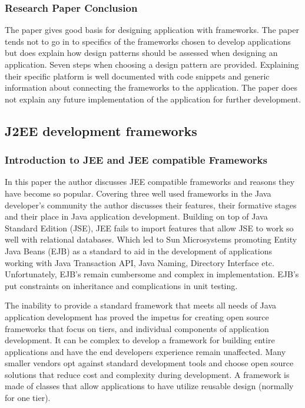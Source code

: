 										\subsubsection{Research Paper Conclusion}
										The paper gives good basis for designing application with frameworks. The paper tends not to go in to specifics of the frameworks chosen to develop applications but does explain how design patterns should be assessed when designing an application. Seven steps when choosing a design pattern are provided. Explaining their specific platform is well documented with code snippets and generic information about connecting the frameworks to the application. The paper does not explain any future implementation of the application for further development.
										
										\subsection{J2EE development frameworks}
										
										\subsubsection{Introduction to JEE and JEE compatible Frameworks}
										In this paper the author discusses JEE compatible frameworks and reasons they have become so popular. Covering three well used frameworks in the Java developer’s community the author discusses their features, their formative stages and their place in Java application development. Building on top of Java Standard Edition (JSE), JEE fails to import features that allow JSE to work so well with relational databases. Which led to Sun Microsystems promoting Entity Java Beans (EJB) as a standard to aid in the development of applications working with Java Transaction API, Java Naming, Directory Interface etc. Unfortunately, EJB’s remain cumbersome and complex in implementation. EJB’s put constraints on inheritance and complications in unit testing. 
										
										The inability to provide a standard framework that meets all needs of Java application development has proved the impetus for creating open source frameworks that focus on tiers, and individual components of application development. It can be complex to develop a framework for building entire applications and have the end developers experience remain unaffected. Many smaller vendors opt against standard development tools and choose open source solutions that reduce cost and complexity during development. A framework is made of classes that allow applications to have utilize reusable design (normally for one tier).
										
